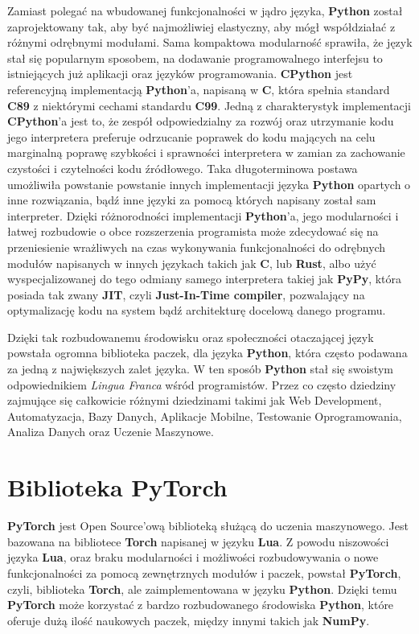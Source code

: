 Zamiast polegać na wbudowanej funkcjonalności w jądro języka, \textbf{Python} został zaprojektowany tak, aby być najmożliwiej elastyczny, aby mógł współdziałać z różnymi odrębnymi modułami. Sama kompaktowa modularność sprawiła, że język stał się popularnym sposobem, na dodawanie programowalnego interfejsu to istniejących już aplikacji oraz języków programowania.
\textbf{CPython} jest referencyjną implementacją \textbf{Python}'a, napisaną w \textbf{C}, która spełnia standard \textbf{C89} z niektórymi cechami standardu \textbf{C99}. Jedną z charakterystyk implementacji \textbf{CPython}'a jest to, że zespół odpowiedzialny za rozwój oraz utrzymanie kodu jego interpretera preferuje odrzucanie poprawek do kodu mających na celu marginalną poprawę szybkości i sprawności interpretera w zamian za zachowanie czystości i czytelności kodu źródłowego. Taka długoterminowa postawa umożliwiła powstanie powstanie innych implementacji języka \textbf{Python} opartych o inne rozwiązania, bądź inne języki za pomocą których napisany został sam interpreter. Dzięki różnorodności implementacji \textbf{Python}'a, jego modularności i łatwej rozbudowie o obce rozszerzenia programista może zdecydować się na przeniesienie wrażliwych na czas wykonywania funkcjonalności do odrębnych modułów napisanych w innych językach takich jak \textbf{C}, lub \textbf{Rust}, albo użyć wyspecjalizowanej do tego odmiany samego interpretera takiej jak \textbf{PyPy}, która posiada tak zwany \textbf{JIT}, czyli \textbf{Just-In-Time compiler}, pozwalający na optymalizację kodu na system bądź architekturę docelową danego programu.

Dzięki tak rozbudowanemu środowisku oraz społeczności otaczającej język powstała ogromna biblioteka paczek, dla języka \textbf{Python}, która często podawana za jedną z największych zalet języka. W ten sposób \textbf{Python} stał się swoistym odpowiednikiem \textit{Lingua Franca} wśród programistów. Przez co często dziedziny zajmujące się całkowicie różnymi dziedzinami takimi jak Web Development, Automatyzacja, Bazy Danych, Aplikacje Mobilne, Testowanie Oprogramowania, Analiza Danych oraz Uczenie Maszynowe.



\section{Biblioteka PyTorch}

\textbf{PyTorch} \cite{PyTorchWebSite} \cite{DeepLearningWithPyTorch} jest Open Source'ową biblioteką służącą do uczenia maszynowego. Jest bazowana na bibliotece \textbf{Torch} napisanej w języku \textbf{Lua}. Z powodu niszowości języka \textbf{Lua}, oraz braku modularności i możliwości rozbudowywania o nowe funkcjonalności za pomocą zewnętrznych modułów i paczek, powstał \textbf{PyTorch}, czyli, biblioteka \textbf{Torch}, ale zaimplementowana w języku \textbf{Python}. Dzięki temu \textbf{PyTorch} może korzystać z bardzo rozbudowanego środowiska \textbf{Python}, które oferuje dużą ilość naukowych paczek, między innymi takich jak \textbf{NumPy}.


